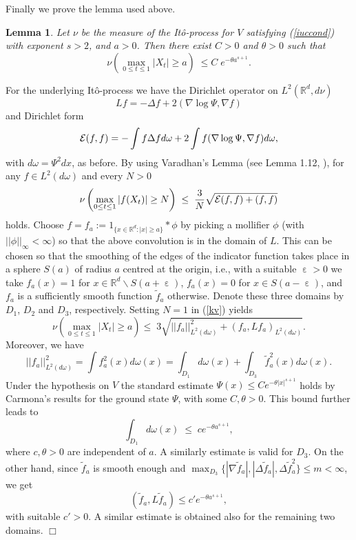 \documentclass[a4paper,11pt]{article}
\newtheorem{lemma}[theorem]{Lemma}
\newenvironment{proof}[1][Proof]{{\sc #1.} }{\hfill $\Box$}
\newcommand{\smallsetminus}{\backslash}
\newcommand{\R}{\mathbb{R}}
\newcommand{\e}{\mathop{\mathrm{{\varepsilon}}}\nolimits}
\begin{document}
Finally we prove the lemma used above. 
\begin{lemma}
Let $\nu$ be the measure of the It\^o-process for $V$ satisfying 
(\ref{iuccond}) with exponent $s > 2$, and $a > 0$. Then 
there exist $C > 0$ and $\theta > 0$ such that
\begin{equation}
\nu\left(\max_{0 \leq t \leq 1} |X_t| \geq a \right) 
\; \leq C \; e^{-\theta a^{s+1}}.
\end{equation}
\label{ldphi}
\end{lemma}
\begin{proof}
For the underlying It\^o-process we have the Dirichlet operator 
on $L^2(\R^d,d\nu)$
\begin{equation}
Lf = -\Delta f + 2 (\nabla \log \Psi, \nabla f)
\end{equation}
and Dirichlet form 
\begin{equation}
{\cal E}(f,f) = - \int f \Delta f d\omega + 
2 \int f (\nabla \log \Psi, \nabla f) d\omega,
\end{equation}
with $d\omega = \Psi^2 dx$, as before. By using Varadhan's Lemma 
(see Lemma 1.12, \cite{KV86}), for any $f \in L^2(d\omega)$ and 
every $N > 0$  
\begin{equation}
\nu \left(\max_{0\leq t\leq 1} |f(X_t)| \geq N\right) 
\; \leq \; \frac{3}{N} \sqrt{{\cal E}(f,f) + (f,f)}
\label{kv}
\end{equation}
holds. Choose $f = f_a := 1_{\{x \in \R^d: |x| \geq a\}} * \phi$ 
by picking a mollifier $\phi$ (with $||\phi||_\infty < \infty$) 
so that the above convolution is in the domain of $L$. This can be 
chosen so that the smoothing of the edges of the indicator function 
takes place in a sphere $S(a)$ of radius $a$ centred at the origin, 
i.e., with a suitable $\e > 0$ we take $f_a(x) = 1$ for $x \in \R^d 
\smallsetminus S(a+\e)$, $f_a(x) = 0$ for $x \in S(a-\e)$, and $f_a$ 
is a sufficiently smooth function ${\tilde f}_a$ otherwise. Denote 
these three domains by $D_1$, $D_2$ and $D_3$, respectively. Setting 
$N=1$ in (\ref{kv}) yields
$$
\nu \left(\max_{0 \leq t \leq 1} |X_t| \geq a \right) \leq \; 
3 \sqrt{||f_a||^2_{L^2(d\omega)} + (f_a, L f_a)_{L^2(d\omega)}}.
$$
Moreover, we have
$$
||f_a||^2_{L^2(d\omega)} = \int f_a^2 (x) d\omega(x) = 
\int_{D_1} d\omega(x) + \int_{D_3} {\tilde f}_a^2(x) d\omega(x).
$$
Under the hypothesis on $V$ the standard estimate 
$
\Psi(x) \le C e^{-\theta |x|^{s+1}}
$
holds by Carmona's results \cite{Ca78} for the ground state $\Psi$, 
with some $C,\theta > 0$. This bound further leads to
\begin{equation}
\int_{D_1}d\omega(x) \; \leq \; c e^{-\theta a^{s+1}},
\end{equation}
where $c,\theta > 0$ are independent of $a$. A similarly estimate is 
valid for $D_3$. On the other hand, since ${\tilde f}_a$ is smooth 
enough and $\max_{D_3} \{ |\nabla {\tilde f}_a|,|\Delta {\tilde f}_a|, 
\Delta {\tilde f}_a^2 \} \leq m < \infty$, we get
$$
({\tilde f}_a, L{\tilde f}_a) \leq c' e^{-\theta a^{s+1}},
$$
with suitable $c'> 0$. A similar estimate is obtained also for the 
remaining two domains. 
\end{proof}
\end{document}
